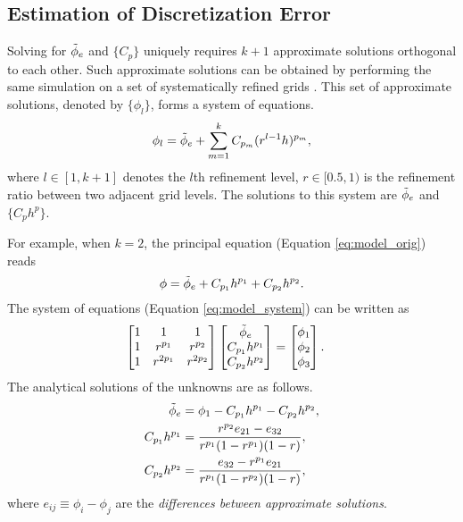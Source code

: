 \subsection{Estimation of Discretization Error} \label{subsec:est_DE}
Solving for $\Tilde{\phi}_e$ and $\{C_{p}\}$ uniquely requires $k + 1$ approximate solutions orthogonal to each other. Such approximate solutions can be obtained by performing the same simulation on a set of systematically refined grids \citep{Roy2010}. This set of approximate solutions, denoted by $\{\phi_l\}$, forms a system of equations.
\begin{equation} \label{eq:model_system}
    \phi_l = \Tilde{\phi}_{e} + \sum_{m=1}^{k} C_{p_m} (r^{l-1} h)^{p_m},
\end{equation}
where $l \in [1,k+1]$ denotes the $l$th refinement level, $r \in [0.5,1)$ is the refinement ratio between two adjacent grid levels. The solutions to this system are $\Tilde{\phi}_e$ and $\{C_{p}h^p\}$.

For example, when $k = 2$, the principal equation (Equation \ref{eq:model_orig}) reads
\begin{equation} \label{eq:model_k2}
    \phi = \Tilde{\phi}_{e} + C_{p_1} h^{p_1} + C_{p_2} h^{p_2}.
\end{equation}
The system of equations (Equation \ref{eq:model_system}) can be written as
\begin{align} \label{eq:sys3eq_t}
    \begin{bmatrix}
        1 & 1 & 1 \\
        1 & r^{p_1} & r^{p_2} \\
        1 & r^{2p_1} & r^{2p_2}
    \end{bmatrix}
    \begin{bmatrix}
        \Tilde{\phi}_{e} \\
        C_{p_1}h^{p_1} \\
        C_{p_2}h^{p_2}
    \end{bmatrix}
    &=
    \begin{bmatrix}
        \phi_1 \\
        \phi_2 \\
        \phi_3
    \end{bmatrix}.
\end{align}
The analytical solutions of the unknowns are as follows.
\begin{align}
    \Tilde{\phi}_{e} &= \phi_1 - C_{p_1} h^{p_1} - C_{p_2} h^{p_2}, \\
    C_{p_1} h^{p_1} &= \frac{r^{p_2} e_{21} - e_{32}}{r^{p_1} (1 - r^{p_1}) (1 - r)}, \label{eq:C_p1} \\
    C_{p_2} h^{p_2} &= \frac{e_{32} - r^{p_1} e_{21}}{r^{p_1} (1 - r^{p_2}) (1 - r)} \label{eq:C_p2},
\end{align}
where $e_{ij} \equiv \phi_i - \phi_j$ are the \textit{differences between approximate solutions}.


